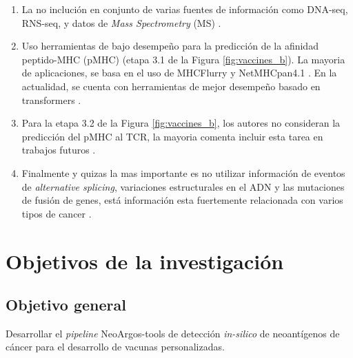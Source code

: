 \documentclass[a4paper]{article}
\begin{document}
\begin{enumerate}
	\item La no inclución en conjunto de varias fuentes de información como DNA-seq, RNS-seq, y datos de \textit{Mass Spectrometry} (MS)  \citep{kim2018neopepsee}.
	\item  Uso herramientas de bajo desempeño para la predicción de la afinidad peptido-MHC (pMHC) (etapa 3.1  de la Figura \ref{fig:vaccines_b}). La mayoria de aplicaciones, se basa en el uso de MHCFlurry \citep{o2020mhcflurry} y NetMHCpan4.1 \citep{reynisson2020netmhcpan}. En la actualidad, se cuenta con herramientas de mejor desempeño basado en transformers \citep{arceda2023neoantigen}.
	\item Para la etapa 3.2 de la Figura \ref{fig:vaccines_b}, los autores no consideran  la predicción del pMHC al TCR, la mayoria comenta incluir esta tarea en trabajos futuros  \citep{rubinsteyn2018computational}.
	\item Finalmente y quizas la mas importante es no utilizar información de eventos de \textit{alternative splicing}, variaciones estructurales en el ADN y las mutaciones de fusión de genes, está información esta fuertemente relacionada con varios tipos de cancer \citep{wood2020neoepiscope}.
\end{enumerate}

	
\section{Objetivos de la investigación}
	
	\subsection{Objetivo general}
	
	Desarrollar el \textit{pipeline} NeoArgos-tools de detección \textit{in-silico} de neoantígenos de cáncer para el desarrollo de vacunas personalizadas.
	
\end{document}
